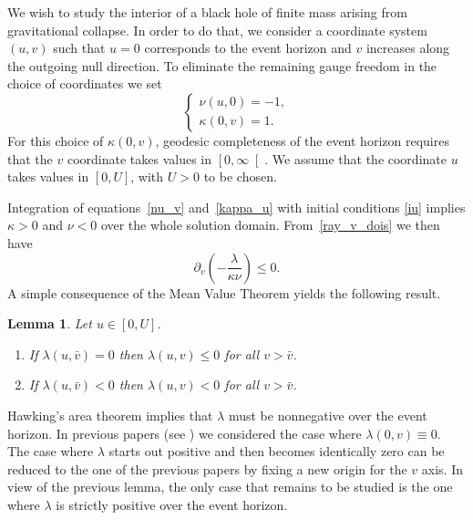 \documentclass[a4paper,11pt,oneside,reqno]{amsart}
\newtheorem{Lem}[Thm]{Lemma}
\begin{document}
We wish to study the interior of a black hole of finite mass arising from gravitational collapse. In order to do that, we consider a coordinate system $(u,v)$ such that $u=0$ corresponds to the event horizon and $v$ increases along the outgoing null direction. To eliminate the remaining gauge freedom in the choice of coordinates we set
\begin{equation}\label{iu}
\begin{cases}
\nu(u,0)=-1,\\
\kappa(0,v)=1.
\end{cases}
\end{equation}
For this choice of $\kappa(0,v)$, geodesic completeness of the event horizon requires that the $v$ coordinate takes values in $\left[0,\infty\right[$. We assume that the coordinate $u$ takes values in  $\left[0,U\right]$, with $U>0$ to be chosen. 

Integration of equations~\eqref{nu_v} and~\eqref{kappa_u} with initial conditions \eqref{iu} implies $\kappa>0$ and $\nu<0$ over the whole solution domain. From~\eqref{ray_v_dois} we then have
\[
\partial_v\left(-\frac{\lambda}{\kappa\nu}\right) \leq 0.
\]
A simple consequence of the Mean Value Theorem yields the following result.
\begin{Lem}\label{sign}
Let $u\in[0,U]$.
\begin{enumerate}[{\rm(i)}]
\item
If $\lambda(u,\bar v)=0$ then $\lambda(u,v)\leq 0$ for all $v>\bar v$.
\item
If $\lambda(u,\bar v)<0$ then $\lambda(u,v)< 0$ for all $v>\bar v$.
\end{enumerate}
\end{Lem} 

Hawking's area theorem implies that $\lambda$ must be nonnegative over the event horizon.
In previous papers (see \cite{relIst1, relIst2, relIst3}) we considered the case where $\lambda(0,v)\equiv 0$.
The case where $\lambda$ starts out positive and then becomes identically zero can be reduced
to the one of the previous papers by fixing a new origin for the $v$ axis.
In view of the previous lemma, the only case that remains to be studied is the one where $\lambda$ is strictly positive over the event
horizon.
\end{document}
